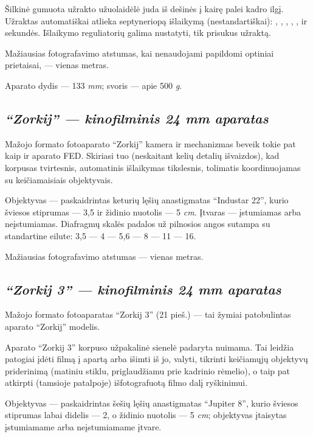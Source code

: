 \documentclass[12pt]{book}
\begin{document}
			Šilkinė gumuota užrakto užuolaidėlė juda iš dešinės į kairę palei kadro ilgį. Užraktas automatiškai atlieka septyneriopą išlaikymą (nestandartiškai): , , , , ,  ir  sekundės. Išlaikymo reguliatorių galima nustatyti, tik prisukus užraktą.

			Mažiausias fotografavimo atstumas, kai nenaudojami papildomi optiniai prietaisai, --- vienas metras.

			Aparato dydis --- 133   \textit{mm}; svoris --- apie 500 \textit{g}.
		\subsection*{\textit{``Zorkij'' --- kinofilminis 24  mm aparatas}}
			Mažojo formato fotoaparato ``Zorkij'' kamera ir mechanizmas beveik tokie pat kaip ir aparato FED. Skiriasi tuo (neskaitant kelių detalių išvaizdos), kad korpusas tvirtesnis, automatinis išlaikymas tikslesnis, tolimatis koordinuojamas su keičiamaisiais objektyvais.

			Objektyvas --- paskaidrintas keturių lęšių anastigmatas ``Industar 22'', kurio šviesos stiprumas --- 3,5 ir židinio nuotolis --- 5 \textit{cm}. Įtvaras --- įstumiamas arba neįstumiamas. Diafragmų skalės padalos už pilnosios angos sutampa su standartine eilute: 3,5 --- 4 --- 5,6 --- 8 --- 11 --- 16.

			Mažiausias fotografavimo atstumas --- vienas metras.
		\subsection*{\textit{``Zorkij 3'' --- kinofilminis 24  mm aparatas}}
			Mažojo formato fotoaparatas ``Zorkij 3'' (21 pieš.) --- tai žymiai patobulintas aparato ``Zorkij'' modelis.

			Aparato ``Zorkij 3'' korpuso užpakalinė sienelė padaryta nuimama. Tai leidžia patogiai įdėti filmą į apartą arba išimti iš jo, valyti, tikrinti keičiamųjų objektyvų priderinimą (matiniu stiklu, priglaudžiamu prie kadrinio rėmelio), o taip pat atkirpti (tamsioje patalpoje) išfotografuotą filmo dalį ryškinimui.

			Objektyvas --- paskaidrintas šešių lęšių anastigmatas ``Jupiter 8'', kurio šviesos stiprumas labai didelis --- 2, o židinio nuotolis --- 5 \textit{cm}; objektyvas įtaisytas įstumiamame arba neįstumiamame įtvare.
\end{document}
